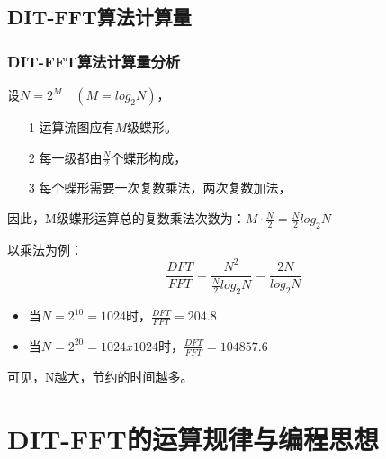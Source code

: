 \documentclass[notheorems,compress,mathserif,table]{beamer}
\begin{document}
\subsection{DIT-FFT算法计算量}
\begin{frame}[shrink]\frametitle{DIT-FFT算法计算量分析}
设$N=2^M\quad(M=log_2 N)$，
\begin{enumerate}
  \item [1] 运算流图应有$M$级蝶形。
  \item [2] 每一级都由$\frac{N}{2}$个蝶形构成，
  \item [3] 每个蝶形需要一次复数乘法，两次复数加法，
\end{enumerate}
因此，M级蝶形运算总的复数乘法次数为：$M\cdot\frac{N}{2}=\frac{N}{2}log_2 N$

以乘法为例：
$$\frac{DFT}{FFT}= \frac{N^2}{\frac{N}{2}log_2 N}=\frac{2N}{log_2 N}$$
\begin{itemize}
  \item 当$N=2^{10}=1024$时，$\frac{DFT}{FFT}=204.8$
  \item 当$N=2^{20}=1024x1024$时，$\frac{DFT}{FFT}= 104857.6$
\end{itemize}
可见，N越大，节约的时间越多。
\end{frame}
\section{DIT-FFT的运算规律与编程思想}
\end{document}
